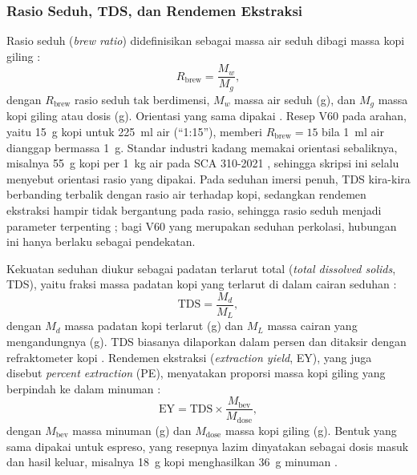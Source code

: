 \subsubsection{Rasio Seduh, TDS, dan Rendemen Ekstraksi}
\label{subsubsec:tds-ey}

Rasio seduh (\textit{brew ratio}) didefinisikan sebagai massa air seduh dibagi massa kopi giling \citep*{liang2021equilibrium}:
\begin{equation}
R_{\mathrm{brew}} = \frac{M_w}{M_g},
\label{eq:rasio-seduh}
\end{equation}
dengan $R_{\mathrm{brew}}$ rasio seduh tak berdimensi, $M_w$ massa air seduh (g), dan $M_g$ massa kopi giling atau dosis (g). Orientasi yang sama dipakai \citet{guinard2023new}. Resep V60 pada arahan, yaitu 15~g kopi untuk 225~ml air (``1:15''), memberi $R_{\mathrm{brew}} = 15$ bila 1~ml air dianggap bermassa 1~g. Standar industri kadang memakai orientasi sebaliknya, misalnya 55~g kopi per 1~kg air pada SCA 310-2021 \citep*{sca2022home}, sehingga skripsi ini selalu menyebut orientasi rasio yang dipakai. Pada seduhan imersi penuh, TDS kira-kira berbanding terbalik dengan rasio air terhadap kopi, sedangkan rendemen ekstraksi hampir tidak bergantung pada rasio, sehingga rasio seduh menjadi parameter terpenting \citep*{liang2021equilibrium}; bagi V60 yang merupakan seduhan perkolasi, hubungan ini hanya berlaku sebagai pendekatan.

Kekuatan seduhan diukur sebagai padatan terlarut total (\textit{total dissolved solids}, TDS), yaitu fraksi massa padatan kopi yang terlarut di dalam cairan seduhan \citep*{liang2021equilibrium, batali2020brew}:
\begin{equation}
\mathrm{TDS} = \frac{M_d}{M_L},
\label{eq:tds}
\end{equation}
dengan $M_d$ massa padatan kopi terlarut (g) dan $M_L$ massa cairan yang mengandungnya (g). TDS biasanya dilaporkan dalam persen dan ditaksir dengan refraktometer kopi \citep*{sca2022home}. Rendemen ekstraksi (\textit{extraction yield}, EY), yang juga disebut \textit{percent extraction} (PE), menyatakan proporsi massa kopi giling yang berpindah ke dalam minuman \citep*{batali2020brew}:
\begin{equation}
\mathrm{EY} = \mathrm{TDS} \times \frac{M_{\mathrm{bev}}}{M_{\mathrm{dose}}},
\label{eq:ey}
\end{equation}
dengan $M_{\mathrm{bev}}$ massa minuman (g) dan $M_{\mathrm{dose}}$ massa kopi giling (g). Bentuk yang sama dipakai untuk espreso, yang resepnya lazim dinyatakan sebagai dosis masuk dan hasil keluar, misalnya 18~g kopi menghasilkan 36~g minuman \citep{moroney2019analysing}.

